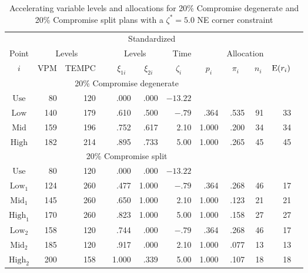 \begin{example}
\begin{table}
\caption{Accelerating variable levels and
allocations for 20\% Compromise  degenerate
and 20\% Compromise split plans with a $\zeta^{*}=5.0$
NE corner constraint}
\centering\small
\begin{tabular}{c*{11}{r}}
&&&&\multicolumn{3}{c}{Standardized}
 \\
\cline{5-7}
Point&\multicolumn{2}{c}{Levels}& &
\multicolumn{2}{c}{Levels} & Time& &\multicolumn{2}{c}{Allocation} \\
\cline{2-3} \cline{5-6} \cline{9-10}
\multicolumn{1}{c}{$i$} &
\multicolumn{1}{c}{VPM} &
\multicolumn{1}{c}{TEMPC} & &
\multicolumn{1}{c}{$\xi_{1i}$} &
\multicolumn{1}{c}{$\xi_{2i}$} &
\multicolumn{1}{c}{$\zeta_{i}$} &
\multicolumn{1}{c}{$p_{i}$} &
\multicolumn{1}{c}{$\pi_{i}$}&
\multicolumn{1}{c}{$n_{i}$}&
\multicolumn{1}{c}{${\rm E}(r_{i})$} \\
\hline
\multicolumn{9}{c}{20\% Compromise  degenerate}\\
  $\mbox{Use}$ &  80 & 120 & & .000     & .000     &$-13.22 $ \\
  $\mbox{Low}$ & 140 & 179 & &  .610 &  .500 &$  -.79 $ &  .364 &  .535 &91 & 33 \\
  $\mbox{Mid}$ & 159 & 196 & &  .752 &  .617 &   2.10   & 1.000 &  .200 &34 & 34 \\
  $\mbox{High}$ & 182 & 214 & &  .895 &  .733 &   5.00   & 1.000 &  .265 &45 & 45  \\
\multicolumn{9}{c}{20\% Compromise split}\\
  $\mbox{Use}$ &  80 & 120 & & .000  & .000  &$-13.22 $ \\
  $\mbox{Low}_{1}$ & 124 & 260 & &  .477 & 1.000 &$  -.79$ &  .364 &  .268 &46 & 17\\
  $\mbox{Mid}_{1}$ & 145 & 260 & &  .650 & 1.000 &   2.10  & 1.000 &  .123 &21 & 21 \\
  $\mbox{High}_{1}$ & 170 & 260 & &  .823 & 1.000 &   5.00  & 1.000 &  .158 &27 & 27\\
  $\mbox{Low}_{2}$ & 158 & 120 & &  .744 &  .000 &$ -.79$ &  .364 &  .268 &46 & 17\\
  $\mbox{Mid}_{2}$ & 185 & 120 & &  .917 &  .000 &   2.10  & 1.000 &  .077 &13 & 13\\
  $\mbox{High}_{2}$ & 200 & 158 & & 1.000 &  .339 &   5.00  & 1.000 &  .107 &18 & 18\\
 \hline
\end{tabular}
\begin{minipage}[t]{4in}
\end{minipage}
\label{table:tvalt.volt.temp.comp.details}
\end{table}


\end{example}
